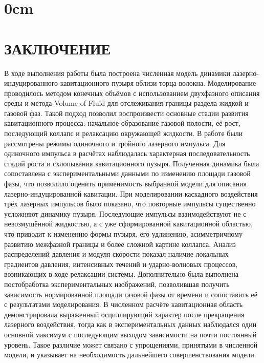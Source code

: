 \newpage
\titleformat{\section}[block]
{\bfseries\normalsize\filcenter}{\thesection}{1em}{}
\titlespacing\section{0cm}{\parskip}{\parskip} 

\section*{\fontsize{16pt}{\baselineskip}\selectfont ЗАКЛЮЧЕНИЕ}
\vspace{0.5\baselineskip}    
В ходе выполнения работы была построена численная модель динамики лазерно-индуцированного кавитационного пузыря вблизи торца волокна. 
Моделирование проводилось методом конечных объёмов с использованием двухфазного описания среды и метода Volume of Fluid для отслеживания границы раздела жидкой и газовой фаз. 
Такой подход позволил воспроизвести основные стадии развития кавитационного процесса: начальное образование газовой полости, её рост, последующий коллапс и релаксацию окружающей жидкости. 
В работе были рассмотрены режимы одиночного и тройного лазерного импульса. 
Для одиночного импульса в расчётах наблюдалась характерная последовательность стадий роста и схлопывания кавитационного пузыря. Полученная динамика была сопоставлена с экспериментальными данными по изменению площади газовой фазы, что позволило оценить применимость выбранной модели для описания лазерно-индуцированной кавитации. 
При моделировании каскадного воздействия трёх лазерных импульсов было показано, что повторные импульсы существенно усложняют динамику пузыря. 
Последующие импульсы взаимодействуют не с невозмущённой жидкостью, а с уже сформированной кавитационной областью, что приводит к изменению формы пузыря, его удлинению, асимметричному развитию межфазной границы и более сложной картине коллапса. 
Анализ распределений давления и модуля скорости показал наличие локальных градиентов давления, интенсивных течений и ударно-волновых процессов, возникающих в ходе релаксации системы. Дополнительно была выполнена постобработка экспериментальных изображений, позволившая получить зависимость нормированной площади газовой фазы от времени и сопоставить её с результатами моделирования. 
В численном расчёте кавитационная область демонстрировала выраженный осциллирующий характер после прекращения лазерного воздействия, тогда как в экспериментальных данных наблюдался один основной максимум с последующим выходом зависимости на почти постоянный уровень. 
Такое различие может связано с упрощениями, принятыми в численной модели, и указывает на необходимость дальнейшего совершенствования модели.

